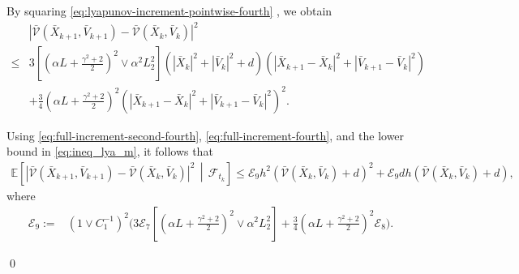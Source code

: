 \documentclass[12pt]{article}
\newenvironment{redtext}
  {\color{black}\ignorespaces}
  {\ignorespacesafterend}
\numberwithin{equation}{section}
\renewenvironment{proof}%
  {\begin{trivlist}%
   \item[]\ignorespaces}%
  {\qed\end{trivlist}}
\begin{document}
\begin{redtext}
\begin{proof}
By squaring \eqref{eq:lyapunov-increment-pointwise-fourth} , we obtain
\begin{align}
&
\left|
\bar{\mathcal V}(\bar X_{k+1},\bar V_{k+1})
-
\bar{\mathcal V}(\bar X_k,\bar V_k)
\right|^2
\nonumber\\
\leq&
3
\left[
\left(
\alpha L+\tfrac{\gamma^2+2}{2}
\right)^2
\vee
\alpha^2L_2^2
\right]
\left(
|\bar X_k|^2+|\bar V_k|^2+d
\right)
\left(
\left|
\bar X_{k+1}-\bar X_k
\right|^2
+
\left|
\bar V_{k+1}-\bar V_k
\right|^2
\right)
\nonumber\\
&+
\tfrac34
\left(
\alpha L+\tfrac{\gamma^2+2}{2}
\right)^2
\left(
\left|
\bar X_{k+1}-\bar X_k
\right|^2
+
\left|
\bar V_{k+1}-\bar V_k
\right|^2
\right)^2.
\end{align}

Using \eqref{eq:full-increment-second-fourth},
\eqref{eq:full-increment-fourth}, and the lower bound in
\eqref{eq:ineq_lya_m}, it follows that
\begin{equation}
\label{eq:lyapunov-increment-second-fourth}
\begin{aligned}
\mathbb E
\left[
\left|
\bar{\mathcal V}(\bar X_{k+1},\bar V_{k+1})
-
\bar{\mathcal V}(\bar X_k,\bar V_k)
\right|^2
\,\middle|\,
\mathcal F_{t_k}
\right]
\leq
\mathcal E_9h^2
\left(
\bar{\mathcal V}(\bar X_k,\bar V_k)+d
\right)^2
+
\mathcal E_9dh
\left(
\bar{\mathcal V}(\bar X_k,\bar V_k)+d
\right),
\end{aligned}
\end{equation}
where
\begin{equation}
\label{eq:E9-fourth-moment}
\begin{aligned}
\mathcal E_9
:={}&
(1\vee C_1^{-1})^2
\Bigg(
3\mathcal E_7
\left[
\left(
\alpha L+\tfrac{\gamma^2+2}{2}
\right)^2
\vee
\alpha^2L_2^2
\right]
+
\tfrac{3}{4}
\left(
\alpha L+\tfrac{\gamma^2+2}{2}
\right)^2
\mathcal E_8
\Bigg).
\end{aligned}
\end{equation}


\end{proof}
\end{redtext}
\end{document}
